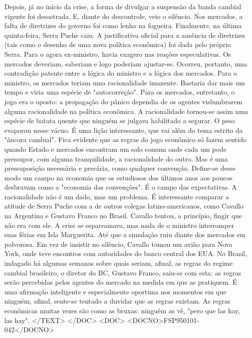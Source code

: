 Depois, já no início da crise, a forma de divulgar a suspensão da banda cambial vigente foi desastrada. E, diante do descontrole, veio o silêncio. Nos mercados, a falta de diretrizes do governo foi como lenha na fogueira. Finalmente, na última quinta-feira, Serra Puche caiu.
A justificativa oficial para a ausência de diretrizes (tais como o desenho de uma nova política econômica) foi dada pelo próprio Serra. Para o agora ex-ministro, havia exagero nas reações especulativas. Os mercados deveriam, saberiam e logo poderiam ajustar-se.
Ocorreu, portanto, uma contradição patente entre a lógica do ministro e a lógica dos mercados. Para o ministro, os mercados teriam uma racionalidade imanente. Bastaria dar mais um tempo e viria uma espécie de "autocorreção".
Para os mercados, entretanto, o jogo era o oposto: a propagação do pânico dependia de os agentes vislumbrarem alguma racionalidade na política econômica. A racionalidade tornou-se assim uma espécie de batata quente que ninguém se julgava habilitado a segurar. O peso evaporou nesse vácuo.
É uma lição interessante, que vai além do tema estrito da "âncora cambial". Fica evidente que as regras do jogo econômico só fazem sentido quando Estado e mercados encontram um solo comum onde cada um pode pressupor, com alguma tranquilidade, a racionalidade do outro. Mas é uma pressuposição necessária e precária, como qualquer convenção.
Define-se desse modo um campo na economia que os estudiosos dos últimos anos aos poucos desbravam como a "economia das convenções". É o campo das expectativas. A racionalidade não é um dado, mas um problema.
É interessante comparar a atitude de Serra Puche com a de outros colegas latino-americanos, como Cavallo na Argentina e Gustavo Franco no Brasil. Cavallo tentou, a princípio, fingir que não era com ele. A crise se esparramava, mas nada de o ministro interromper suas férias em Isla Marguerita.
Até que a simulação ruiu diante dos mercados em polvorosa. Em vez de insistir no silêncio, Cavallo tomou um avião para Nova York, onde teve encontros com autoridades do banco central dos EUA.
No Brasil, indagado há algumas semanas sobre quais seriam, afinal, as regras do regime cambial brasileiro, o diretor do BC, Gustavo Franco, saiu-se com esta: as regras serão percebidas pelos agentes do mercado na medida em que as pratiquem.
É uma afirmação inteligente e especialmente oportuna nos momentos em que ninguém, afinal, sente-se tentado a duvidar que as regras existam. As regras econômicas muitas vezes são como as bruxas: ninguém as vê, "pero que las hay, las hay".
</TEXT>
</DOC>
<DOC>
<DOCNO>FSP950101-042</DOCNO>

